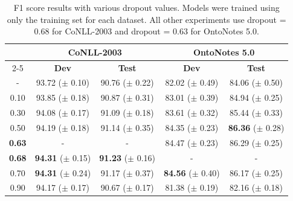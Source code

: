 \documentclass[11pt,letterpaper]{article}
\begin{document}
\begin{table}[t]
\begin{center}
\small
\begin{tabular}{|c|c|c|c|c|}
\hline \bf \multirow{2}{*}{Dropout} & \multicolumn{2}{c|}{\bf CoNLL-2003} & \multicolumn{2}{c|}{\bf OntoNotes 5.0} \\ \cline{2-5}
 & \bf Dev & \bf Test & \bf Dev & \bf Test \\ \hline
\--     & 93.72 ($\pm$ 0.10) & 90.76 ($\pm$ 0.22) & 82.02 ($\pm$ 0.49) & 84.06 ($\pm$ 0.50) \\
0.10 & 93.85 ($\pm$ 0.18) & 90.87 ($\pm$ 0.31) & 83.01 ($\pm$ 0.39) & 84.94 ($\pm$ 0.25) \\
0.30 & 94.08 ($\pm$ 0.17) & 91.09 ($\pm$ 0.18) & 83.61 ($\pm$ 0.32) & 85.44 ($\pm$ 0.33) \\
0.50 & 94.19 ($\pm$ 0.18) & 91.14 ($\pm$ 0.35) & 84.35 ($\pm$ 0.23) & {\bf 86.36} ($\pm$ 0.28) \\
\textbf{0.63} & \-- & \-- & 84.47 ($\pm$ 0.23) & 86.29 ($\pm$ 0.25) \\
\textbf{0.68} & {\bf 94.31} ($\pm$ 0.15) & {\bf 91.23} ($\pm$ 0.16) & \-- & \-- \\
0.70 & {\bf 94.31} ($\pm$ 0.24) & 91.17 ($\pm$ 0.37) & {\bf 84.56} ($\pm$ 0.40) & 86.17 ($\pm$ 0.25) \\
0.90 & 94.17 ($\pm$ 0.17) & 90.67 ($\pm$ 0.17) & 81.38 ($\pm$ 0.19) & 82.16 ($\pm$ 0.18) \\


\hline
\end{tabular}
\end{center}
\caption{F1 score results with various dropout values. Models were trained using only the training set for each dataset. All other experiments use dropout = 0.68 for CoNLL-2003 and dropout = 0.63 for OntoNotes 5.0.
}
\label{tab:dropout-res-conll}
\end{table}
\end{document}
